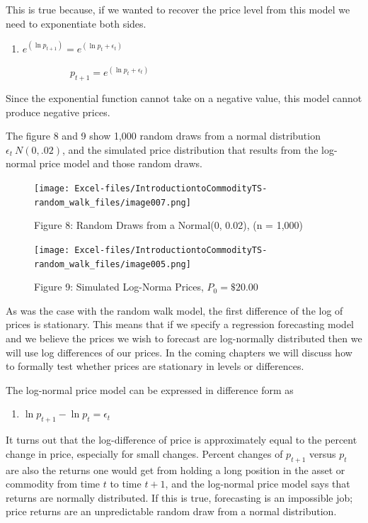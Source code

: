 \documentclass[
]{book}
\providecommand{\tightlist}{%
  \setlength{\itemsep}{0pt}\setlength{\parskip}{0pt}}
\begin{document}
This is true because, if we wanted to recover the price level from this model we need to exponentiate both sides.

\begin{enumerate}
\def\labelenumi{(\arabic{enumi})}
\setcounter{enumi}{5}
\tightlist
\item
  \(e^{(\ln{p_{t+1}})} = e^{(\ln{p_{t}} + \epsilon_t)}\)
\end{enumerate}

~~~~~~~~~~~~~\(p_{t+1} = e^{(\ln{p_{t}} + \epsilon_t)}\)

Since the exponential function cannot take on a negative value, this model cannot produce negative prices.

The figure 8 and 9 show 1,000 random draws from a normal distribution \(\epsilon_t ~ N(0, .02)\), and the simulated price distribution that results from the log-normal price model and those random draws.

\begin{figure}
\centering
\texttt{[image: Excel-files/IntroductiontoCommodityTS-random\_walk\_files/image007.png]}
\caption{Figure 8: Random Draws from a Normal(0, 0.02), (n = 1,000)}
\end{figure}

\begin{figure}
\centering
\texttt{[image: Excel-files/IntroductiontoCommodityTS-random\_walk\_files/image005.png]}
\caption{Figure 9: Simulated Log-Norma Prices, \(P_0 = \$20.00\)}
\end{figure}

As was the case with the random walk model, the first difference of the log of prices is stationary. This means that if we specify a regression forecasting model and we believe the prices we wish to forecast are log-normally distributed then we will use log differences of our prices. In the coming chapters we will discuss how to formally test whether prices are stationary in levels or differences.

The log-normal price model can be expressed in difference form as

\begin{enumerate}
\def\labelenumi{(\arabic{enumi})}
\setcounter{enumi}{6}
\tightlist
\item
  \(\ln{p_{t+1}} - \ln{p_{t}} = \epsilon_t\)
\end{enumerate}

It turns out that the log-difference of price is approximately equal to the percent change in price, especially for small changes. Percent changes of \(p_{t+1}\) versus \(p_t\) are also the returns one would get from holding a long position in the asset or commodity from time \(t\) to time \(t+1\), and the log-normal price model says that returns are normally distributed. If this is true, forecasting is an impossible job; price returns are an unpredictable random draw from a normal distribution.
\end{document}

